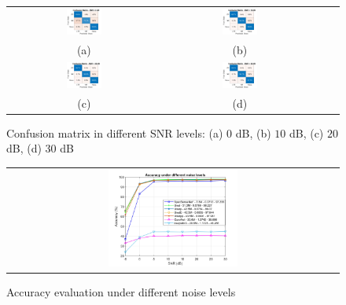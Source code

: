 \documentclass[journal]{IEEEtran} %
\begin{document}
\begin{figure}[!t]
    \centering
    \footnotesize
    \begin{tabular}{cccc}
        \includegraphics[width=0.24\textwidth]{img/confusion_matrix_0dB.jpg} & 
        \includegraphics[width=0.24\textwidth]{img/confusion_matrix_10dB.jpg} & \\ (a) & (b) \\
        \includegraphics[width=0.24\textwidth]{img/confusion_matrix_20dB.jpg} & 
        \includegraphics[width=0.24\textwidth]{img/confusion_matrix_30dB.jpg} & \\ (c) & (d)
    \end{tabular}
    \caption{Confusion matrix in different SNR levels: (a) $0$ dB, (b) $10$ dB, (c) $20$ dB, (d) $30$ dB}
    \label{fig5}
\end{figure}

\begin{figure}[!t]
    \centering
    \footnotesize
    \begin{tabular}{c}
        \includegraphics[width=0.4\textwidth]{img/accuracy_SNRs.jpg}
    \end{tabular}
    \caption{Accuracy evaluation under different noise levels}
    \label{fig6}
\end{figure}
\end{document}
